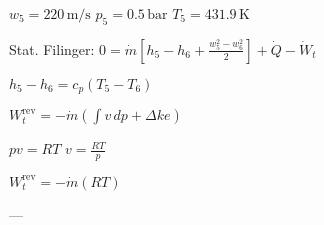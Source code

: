 \( w_5 = 220 \, \text{m/s} \)  
\( p_5 = 0.5 \, \text{bar} \)  
\( T_5 = 431.9 \, \text{K} \)  

Stat. Filinger:  
\( 0 = \dot{m} \left[ h_5 - h_6 + \frac{w_5^2 - w_6^2}{2} \right] + \dot{Q} - \dot{W}_t \)  

\( h_5 - h_6 = c_p (T_5 - T_6) \)  

\( W_t^{\text{rev}} = -\dot{m} \left( \int v \, dp + \Delta ke \right) \)  

\( p v = RT \)  
\( v = \frac{RT}{p} \)  

\( W_t^{\text{rev}} = -\dot{m} (RT) \)  

---